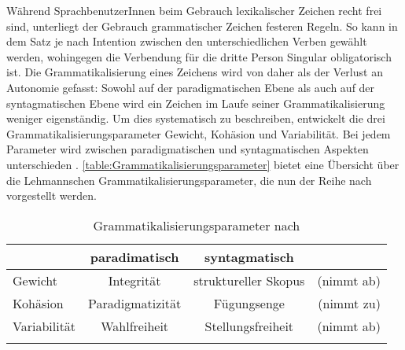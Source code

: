 Während SprachbenutzerInnen beim Gebrauch lexikalischer Zeichen recht frei sind, unterliegt der Gebrauch grammatischer Zeichen festeren Regeln. 
So kann in dem Satz  je nach Intention zwischen den unterschiedlichen Verben gewählt werden, wohingegen die Verbendung für die dritte Person Singular obligatorisch ist.  
Die Grammatikalisierung eines Zeichens wird von \citet[130]{Lehmann.1995} daher als der Verlust an Autonomie gefasst: 
Sowohl auf der paradigmatischen Ebene als auch auf der syntagmatischen Ebene wird ein Zeichen im Laufe seiner Grammatikalisierung weniger eigenständig. 
Um dies systematisch zu beschreiben, entwickelt \citet[305]{Lehmann.1985} die drei Grammatikalisierungsparameter Gewicht, Kohäsion und Variabilität. 
Bei jedem Parameter wird zwischen paradigmatischen und syntagmatischen Aspekten unterschieden \citep[s.][131]{Lehmann.1995}. 
\autoref{table:Grammatikalisierungsparameter}  bietet eine Übersicht über die Lehmannschen Grammatikalisierungsparameter, die nun der Reihe nach vorgestellt werden.  
\begin{table}
\centering
\begin{tabular}{lccr}
\lsptoprule
                 & paradimatisch & syntagmatisch  & \\
                 \midrule
Gewicht     & Integrität           & struktureller Skopus & (nimmt ab) \\
Kohäsion   &   Paradigmatizität   &  Fügungsenge & (nimmt zu) \\
Variabilität  & Wahlfreiheit        & Stellungsfreiheit  & (nimmt ab)\\
\lspbottomrule
\end{tabular}
\caption{Grammatikalisierungsparameter nach \citet[132]{Lehmann.1995}}
\label{table:Grammatikalisierungsparameter}
\end{table}

